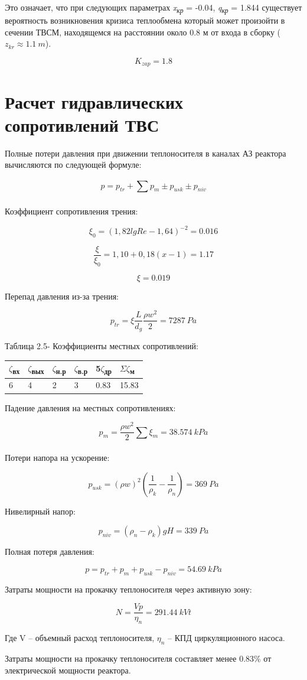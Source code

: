 Это означает, что при следующих параметрах \emph{x\textsubscript{кр}} =
-0.04, \emph{q\textsubscript{кр}} = 1.844 существует вероятность
возникновения кризиса теплообмена который может произойти в сечении
ТВСМ, находящемся на расстоянии около 0.8 м от входа в сборку
(\(z_{kr} \approx 1.1\ m\)).

\[K_{zap} = 1.8\]

\section{Расчет гидравлических сопротивлений ТВС}

Полные потери давления при движении теплоносителя в каналах АЗ реактора
вычисляются по следующей формуле:

\[p = p_{tr} + \sum_{}^{}{p_{m} \pm p_{usk} \pm p_{niv}}\]

Коэффициент сопротивления трения:

\[\xi_{0} = {(1,82lgRe - 1,64)}^{- 2} = 0.016\]

\[\frac{\xi}{\xi_{0}} = 1,10 + 0,18\left( x - 1 \right) = 1.17\]

\[\xi = 0.019\]

Перепад давления из-за трения:

\[p_{tr} = \xi\frac{L}{d_{g}}\frac{\rho w^{2}}{2} = 7287\ Pa\]

Таблица 2.5- Коэффициенты местных сопротивлений:

\begin{longtable}[]{@{}llllll@{}}
\toprule
$\zeta$\textsubscript{вх} & $\zeta$\textsubscript{вых} & $\zeta$\textsubscript{н.р} &
$\zeta$\textsubscript{в.р} & 5$\zeta$\textsubscript{др} &
$\Sigma$$\zeta$\textsubscript{м}\tabularnewline
\midrule
\endhead
6 & 4 & 2 & 3 & 0.83 & 15.83\tabularnewline
\bottomrule
\end{longtable}

Падение давления на местных сопротивлениях:

\[p_{m} = \frac{\rho w^{2}}{2}\sum_{}^{}{\xi_{m} = 38.574\ kPa}\]

Потери напора на ускорение:

\[p_{usk} = \left( \rho w \right)^{2}\left( \frac{1}{\rho_{k}} - \frac{1}{\rho_{n}} \right) = 369\ Pa\]

Нивелирный напор:

\[p_{niv} = \left( \rho_{n} - \rho_{k} \right)gH = 339\ Pa\]

Полная потеря давления:

\[p = p_{tr} + p_{m} + p_{usk} - p_{niv} = 54.69\ kPa\]

Затраты мощности на прокачку теплоносителя через активную зону:

\[N = \frac{Vp}{\eta_{n}} = 291.44\ kVt\]

Где V -- объемный расход теплоносителя, \(\eta_{n}\) -- КПД
циркуляционного насоса.

Затраты мощности на прокачку теплоносителя составляет менее 0.83\% от
электрической мощности реактора.
